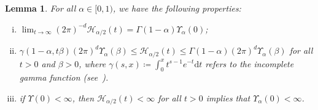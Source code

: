 \documentclass[sn-mathphys]{sn-jnl}%
\newcommand{\ud}{\ensuremath{\mathrm{d}}}
\numberwithin{equation}{section}
\theoremstyle{thmstyleone}%
\newtheorem{lemma}[theorem]{Lemma}
\theoremstyle{thmstyletwo}%
\theoremstyle{thmstylethree}%
\begin{document}
\begin{lemma}\label{L:HUA}
  For all $\alpha\in [0,1)$, we have the following properties:
  \begin{enumerate}[(i)]
    \item $\displaystyle \lim_{t\to\infty}\left(2\pi\right)^{-d}\mathcal{H}_{\alpha/2}(t) =
      \Gamma\left(1-\alpha\right) \Upsilon_{\alpha}(0)$;
    \item $\gamma\left(1-\alpha,t\beta\right) \left(2\pi\right)^d \Upsilon_\alpha(\beta) \le
      \mathcal{H}_{\alpha/2}(t) \le \Gamma\left(1-\alpha\right) \left(2\pi\right)^d
      \Upsilon_\alpha(\beta)$ for all $t>0$ and $\beta>0$, where $\gamma(s,x)\coloneqq \int_0^x
      t^{s-1} e^{-t}\ud t$ refers to the incomplete gamma function
      (see~\cite{olver.lozier.ea:10:nist}).
    \item if $\Upsilon(0)<\infty$, then $\mathcal{H}_{\alpha/2}(t)<\infty$ for all $t>0$ implies
      that $\Upsilon_\alpha(0)<\infty$.
  \end{enumerate}
\end{lemma}
\end{document}
